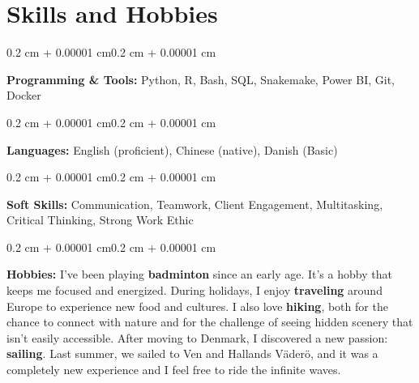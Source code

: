 \documentclass[10pt, letterpaper]{article}
\newenvironment{onecolentry}{
    \begin{adjustwidth}{0.2 cm + 0.00001 cm}{0.2 cm + 0.00001 cm}
}{
    \end{adjustwidth}
}
\begin{document}
    \section{Skills and Hobbies}

        \begin{onecolentry}
            \textbf{Programming \& Tools:} Python, R, Bash, SQL, Snakemake, Power BI, Git, Docker
        \end{onecolentry}

        \vspace{0.2 cm}

        \begin{onecolentry}
            \textbf{Languages:} English (proficient), Chinese (native), Danish (Basic)
        \end{onecolentry}

        \vspace{0.2 cm}

        \begin{onecolentry}
            \textbf{Soft Skills:} Communication, Teamwork, Client Engagement, Multitasking, Critical Thinking, Strong Work Ethic
        \end{onecolentry}

        \vspace{0.2 cm}

        \begin{onecolentry}
            \textbf{Hobbies:}
            I've been playing \textbf{badminton} since an early age. It's a hobby that keeps me focused and energized. During holidays, I enjoy \textbf{traveling} around Europe to experience new food and cultures. I also love \textbf{hiking}, both for the chance to connect with nature and for the challenge of seeing hidden scenery that isn't easily accessible. After moving to Denmark, I discovered a new passion: \textbf{sailing}. Last summer, we sailed to Ven and Hallands Väderö, and it was a completely new experience and I feel free to ride the infinite waves.
        \end{onecolentry}
\end{document}
